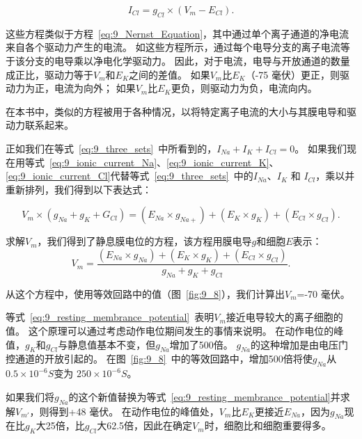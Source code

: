 \begin{proposition}[利用等效回路模型计算静息膜电位]
	\begin{equation}\label{eq:9_ionic_current_Cl}
		I_{Cl} = g_{Cl} \times (V_m - E_{Cl}).
	\end{equation}
	
	\quad \quad 这些方程类似于方程~\ref{eq:9_Nernst_Equation}，其中通过单个离子通道的净电流来自各个驱动力产生的电流。
	如这些方程所示，通过每个电导分支的离子电流等于该分支的电导乘以净电化学驱动力。
	因此，对于电流，电导与开放通道的数量成正比，驱动力等于$V_m$和$E_K$之间的差值。
	如果$V_m$比$E_K$（-75 毫伏）更正，则驱动力为正，电流为向外；
	如果$V_m$比$E_K$更负，则驱动力为负，电流向内。
	
	\quad \quad 在本书中，类似的方程被用于各种情况，以将特定离子电流的大小与其膜电导和驱动力联系起来。
	
	\quad \quad 正如我们在等式~\ref{eq:9_three_sets}~中所看到的，$ I_{Na} + I_{K} + I_{Cl} = 0 $。
	如果我们现在用等式~\ref{eq:9_ionic_current_Na}、\ref{eq:9_ionic_current_K}、\ref{eq:9_ionic_current_Cl}代替等式~\ref{eq:9_three_sets}~中的$ I_{Na} $、$ I_{K} $ 和 $ I_{Cl} $，乘以并重新排列，我们得到以下表达式：
	
	\begin{equation}\label{eq:9_rearrange_three}
		V_m \times (g_{Na} + g_K + G_{Cl}) = 
		(E_{Na} \times g_{Na+}) + (E_K \times g_K) + (E_{Cl} \times g_{Cl}).
	\end{equation}
	
	\quad \quad 求解$V_m$，我们得到了静息膜电位的方程，该方程用膜电导$ g $和细胞$ E $表示：
	\begin{equation}\label{eq:9_resting_membrance_potential}
		V_m = 
		\frac{
			(E_{Na} \times g_{Na}) + 
			(E_K \times g_K) + 
			(E_{Cl} \times g_{Cl})
		}
		{
			g_{Na} + g_{K} + g_{Cl}
		}.
	\end{equation}
	
	\quad \quad 从这个方程中，使用等效回路中的值（图~\ref{fig:9_8}），我们计算出$V_m$=-70 毫伏。
	
	\quad \quad 等式~\ref{eq:9_resting_membrance_potential}~表明$V_m$接近电导较大的离子细胞的值。
	这个原理可以通过考虑动作电位期间发生的事情来说明。
	在动作电位的峰值，$ g_K $和$ g_{Cl} $与静息值基本不变，但$ g_{Na} $增加了500倍。
	$ g_{Na} $的这种增加是由电压门控通道的开放引起的。
	在图~\ref{fig:9_8}~中的等效回路中，增加500倍将使$ g_{Na} $从 $ 0.5\times 10^{-6} S$变为 $ 250 \times 10^{-6} S $。
	
	\quad \quad 如果我们将$ g_{Na} $的这个新值替换为等式~\ref{eq:9_resting_membrance_potential}并求解$V_{m'}$，则得到+48 毫伏。
	在动作电位的峰值处，$V_m$比$E_K$更接近$ E_{Na} $，因为$ g_{Na} $现在比$ g_K $大25倍，比$ g_{Cl} $大62.5倍，因此在确定$V_m$时，细胞比和细胞重要得多。
	

\end{proposition}
